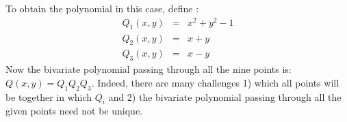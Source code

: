\begin{minipage}{0.4\linewidth}
\end{minipage}
\begin{minipage}{0.5\linewidth}
To obtain the polynomial in this case, define :
\begin{eqnarray*}
 Q_1(x,y) &=& x^2+y^2-1 \\
 Q_2(x,y) &=& x+y \\
 Q_3(x,y) &=& x-y
\end{eqnarray*}
Now the bivariate polynomial passing through all the nine points is: $Q(x,y) = Q_1 Q_2 Q_3$. Indeed, there are many challenges 1) which all points will be together in which $Q_i$ and 2) the bivariate polynomial passing through all the given points need not be unique. 
\end{minipage}

